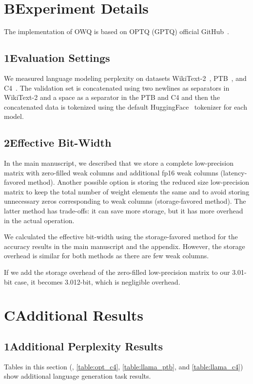 \documentclass[letterpaper]{article} %
\begin{document}
\section*{B\quad Experiment Details}

The implementation of OWQ is based on OPTQ (GPTQ) official GitHub~\cite{gptq2022}.

\subsection*{1\quad Evaluation Settings}
We measured language modeling perplexity on datasets WikiText-2~\cite{merity2016pointer}, PTB~\cite{marcus1994penn}, and C4~\cite{raffel2020exploring}. The validation set is concatenated using two newlines as separators in WikiText-2 and a space as a separator in the PTB and C4 and then the concatenated data is tokenized using the default HuggingFace~\cite{wolf2019huggingface} tokenizer for each model.

\subsection*{2\quad Effective Bit-Width}
\bigbreak
In the main manuscript, we described that we store a complete low-precision matrix with zero-filled weak columns and additional fp16 weak columns (latency-favored method). Another possible option is storing the reduced size low-precision matrix to keep the total number of weight elements the same and to avoid storing unnecessary zeros corresponding to weak columns (storage-favored method). The latter method has trade-offs: it can save more storage, but it has more overhead in the actual operation.

We calculated the effective bit-width using the storage-favored method for the accuracy results in the main manuscript and the appendix. However, the storage overhead is similar for both methods as there are few weak columns. 

If we add the storage overhead of the zero-filled low-precision matrix to our 3.01-bit case, it becomes 3.012-bit, which is negligible overhead.


\section*{C\quad Additional Results}

\subsection*{1\quad Additional Perplexity Results}
Tables in this section (, \ref{table:opt_c4}, \ref{table:llama_ptb}, and \ref{table:llama_c4}) show additional language generation task results. 
\end{document}
